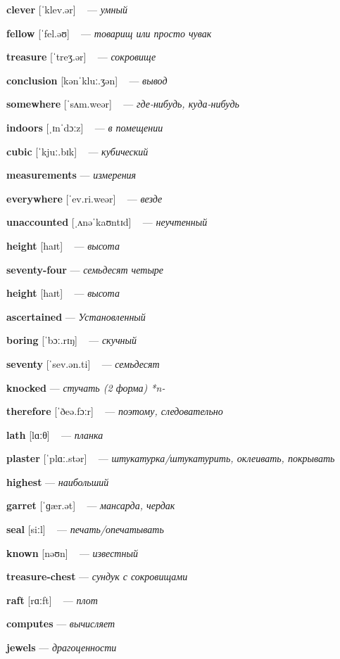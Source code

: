\documentclass[a4paper,oneside,12pt]{amsart}
\begin{document}
{\large 

 {\bf clever } [ˈklev.ər] ~ --- \emph{ умный }

{\bf fellow } [ˈfel.əʊ] ~ --- \emph{ товарищ или просто чувак }

{\bf treasure } [ˈtreʒ.ər] ~ --- \emph{ сокровище }

{\bf conclusion } [kənˈkluː.ʒən] ~ --- \emph{ вывод }

{\bf somewhere } [ˈsʌm.weər] ~ --- \emph{ где-нибудь, куда-нибудь }

{\bf indoors } [ˌɪnˈdɔːz] ~ --- \emph{ в помещении }

{\bf cubic } [ˈkjuː.bɪk] ~ --- \emph{ кубический }

{\bf measurements } --- \emph{ измерения }

{\bf everywhere } [ˈev.ri.weər] ~ --- \emph{ везде }

{\bf unaccounted } [ˌʌnəˈkaʊntɪd] ~ --- \emph{ неучтенный }

{\bf height } [haɪt] ~ --- \emph{ высота }

{\bf seventy-four } --- \emph{ семьдесят четыре }

{\bf height } [haɪt] ~ --- \emph{ высота }

{\bf ascertained } --- \emph{ Установленный }

{\bf boring } [ˈbɔː.rɪŋ] ~ --- \emph{ скучный }

{\bf seventy } [ˈsev.ən.ti] ~ --- \emph{ семьдесят }

{\bf knocked } --- \emph{ стучать (2 форма) *n- }

{\bf therefore } [ˈðeə.fɔːr] ~ --- \emph{ поэтому, следовательно }

{\bf lath } [lɑːθ] ~ --- \emph{ планка }

{\bf plaster } [ˈplɑː.stər] ~ --- \emph{ штукатурка/штукатурить, оклеивать, покрывать }

{\bf highest } --- \emph{ наибольший }

{\bf garret } [ˈɡær.ət] ~ --- \emph{ мансарда, чердак }

{\bf seal } [siːl] ~ --- \emph{ печать/опечатывать }

{\bf known } [nəʊn] ~ --- \emph{ известный }

{\bf treasure-chest } --- \emph{ сундук с сокровищами }

{\bf raft } [rɑːft] ~ --- \emph{ плот }

{\bf computes } --- \emph{ вычисляет }

{\bf jewels } --- \emph{ драгоценности }

}
\end{document}

